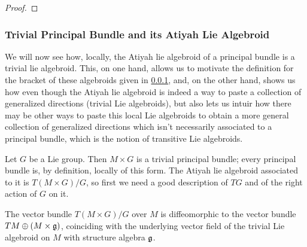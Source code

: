 \begin{proof}

\end{proof}

\subsubsection{Trivial Principal Bundle and its Atiyah Lie Algebroid}

We will now see how, locally, the Atiyah lie algebroid of a principal bundle is a trivial lie algebroid. This, on one hand, allows us to motivate the definition for the bracket of these algebroids given in \ref{}, and, on the other hand, shows us how even though the Atiyah lie algebroid is indeed a way to paste a collection of generalized directions (trivial Lie algebroids), but also lets us intuir how there may be other ways to paste this local Lie algebroids to obtain a more general collection of generalized directions which isn't necessarily associated to a principal bundle, which is the notion of transitive Lie algebroids.

Let $G$ be a Lie group. Then $M \times G$ is a trivial principal bundle; every principal bundle is, by definition, locally of this form. The Atiyah lie algebroid associated to it is $T(M \times G)/G$, so first we need a good description of $TG$ and of the right action of $G$ on it. 

\begin{proposition}
The vector bundle $T(M \times G)/G$ over $M$ is diffeomorphic to the vector bundle $TM \oplus (M \times \mathfrak{g})$, coinciding with the underlying vector field of the trivial Lie algebroid on $M$ with structure algebra $\mathfrak{g}$.
\end{proposition}

